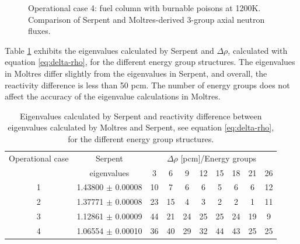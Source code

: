 \begin{figure}[htbp!]
  \centering
  \hfill
  \caption{Operational case 4: fuel column with burnable poisons at 1200K. Comparison of Serpent and Moltres-derived 3-group axial neutron fluxes.}
  \label{fig:assembly-LBP-1200-flux}
\end{figure}

Table \ref{tab:keff} exhibits the eigenvalues calculated by Serpent and $\Delta \rho$, calculated with equation \ref{eq:delta-rho}, for the different energy group structures.
The eigenvalues in Moltres differ slightly from the eigenvalues in Serpent, and overall, the reactivity difference is less than 50 pcm.
The number of energy groups does not affect the accuracy of the eigenvalue calculations in Moltres.

\begin{table}[htbp!]
  \centering
  \caption{Eigenvalues calculated by Serpent and reactivity difference between eigenvalues calculated by Moltres and Serpent, see equation \ref{eq:delta-rho}, for the different energy group structures.}
  \begin{tabular}{c|c|cccccccc}
  \toprule
Operational case  & Serpent       & \multicolumn{8}{c}{$\Delta \rho$ [pcm]/Energy groups}            \\ \cline{3-10} 
                  & eigenvalues   & 3   & 6   & 9   & 12   & 15   & 18   & 21   & 26   \\
  \midrule
1 & 1.43800 $\pm$ 0.00008 & 10  & 7   & 6   & 6    & 5    & 6    & 6    & 12   \\
2 & 1.37771 $\pm$ 0.00008 & 23  & 15  & 4   & 3    & 2    & 2    & 1    & 11   \\
3 & 1.12861 $\pm$ 0.00009 & 44  & 21  & 24  & 25   & 25   & 24   & 19   & 9    \\
4 & 1.06554 $\pm$ 0.00010 & 36  & 40  & 29  & 32   & 44   & 43   & 25   & 25   \\
  \bottomrule
  \end{tabular}
  \label{tab:keff}
\end{table}

